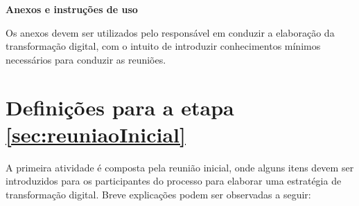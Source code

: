 \begin{center}
    \textbf{\huge Anexos e instruções de uso}
\end{center}

Os anexos devem ser utilizados pelo responsável em conduzir a elaboração da transformação digital, com o intuito de introduzir conhecimentos mínimos necessários para conduzir as reuniões.

\section*{Definições para a etapa \ref{sec:reuniaoInicial}}

A primeira atividade é composta pela reunião inicial, onde alguns itens devem ser introduzidos para os participantes do processo para elaborar uma estratégia de transformação digital. Breve explicações podem ser observadas a seguir:

